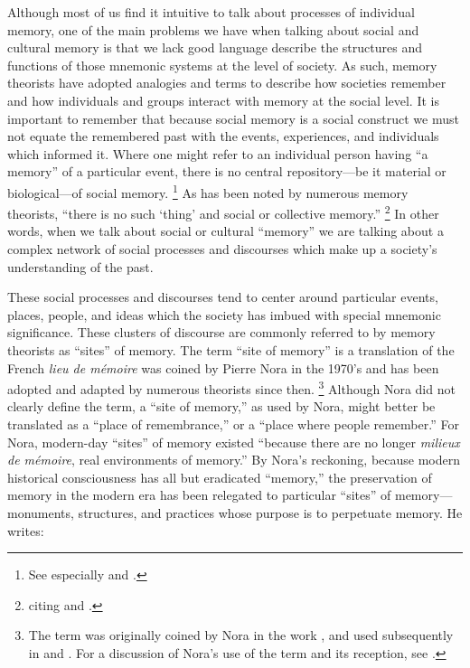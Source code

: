 Although most of us find it intuitive to talk about processes of individual memory, one of the main problems we have when talking about social and cultural memory is that we lack good language describe the structures and functions of those mnemonic systems at the level of society. As such, memory theorists have adopted analogies and terms to describe how societies remember and how individuals and groups interact with memory at the social level. It is important to remember that because social memory is a social construct we must not equate the remembered past with the events, experiences, and individuals which informed it. Where one might refer to an individual person having ``a memory'' of a particular event, there is no central repository---be it material or biological---of social memory.%
    \footnote{See especially \cite{brockmeier_cp2010} and \cite{wertsch_cp2011}.}  
As has been noted by numerous memory theorists, ``there is no such `thing' and social or collective memory.''%
    \footnote{\cite[14]{wilson2017} citing \cite[112]{olick-robbins_ars1998} and \cite[118--24]{wertsch_boyer-wertsch2009}.}
In other words, when we talk about social or cultural ``memory'' we are talking about a complex network of social processes and discourses which make up a society's understanding of the past.

These social processes and discourses tend to center around particular events, places, people, and ideas which the society has imbued with special mnemonic significance. These clusters of discourse are commonly referred to by memory theorists as ``sites'' of memory. The term ``site of memory'' is a translation of the French \emph{lieu de mémoire} was coined by Pierre Nora in the 1970's and has been adopted and adapted by numerous theorists since then.%
    \footnote{%
        The term was originally coined by Nora in the work
        \cite*{nora_goff-etal1978}, and used subsequently in 
        \cite*{nora1984} and 
        \cite*{nora_representations1989}. For a discussion of Nora's use of the term and its reception, see 
        \cite{szpociński_teksty-drugie2016}.}
Although Nora did not clearly define the term, a ``site of memory,'' as used by Nora, might better be translated as a ``place of remembrance,'' or a ``place where people remember.'' For Nora, modern-day ``sites'' of memory existed ``because there are no longer \emph{milieux de mémoire}, real environments of memory.''%
    \autocite[7]{nora_representations1989}
By Nora's reckoning, because modern historical consciousness has all but eradicated ``memory,'' the preservation of memory in the modern era has been relegated to particular ``sites'' of memory---monuments, structures, and practices whose purpose is to perpetuate memory. He writes:

